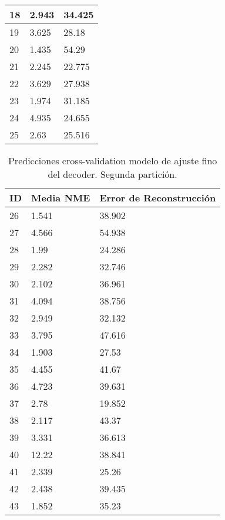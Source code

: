 \begin{table}[!ht]
\begin{tabular}{|l|l|l|}
        18 & 2.943 & 34.425 \\ \hline
        19 & 3.625 & 28.18 \\ \hline
        20 & 1.435 & 54.29 \\ \hline
        21 & 2.245 & 22.775 \\ \hline
        22 & 3.629 & 27.938 \\ \hline
        23 & 1.974 & 31.185 \\ \hline
        24 & 4.935 & 24.655 \\ \hline
        25 & 2.63 & 25.516 \\ \hline
    \end{tabular}
\end{table}

\begin{table}[!ht]
    \centering
    \caption{Predicciones cross-validation modelo de ajuste fino del  decoder. Segunda partición.}
    \begin{tabular}{|l|l|l|}
    \hline
    \cellcolor{gray!25}\textbf{ID} & \cellcolor{gray!25}\textbf{Media NME} & \cellcolor{gray!25}\textbf{Error de Reconstrucción} \\ \hline
        26 & 1.541 & 38.902 \\ \hline
        27 & 4.566 & 54.938 \\ \hline
        28 & 1.99 & 24.286 \\ \hline
        29 & 2.282 & 32.746 \\ \hline
        30 & 2.102 & 36.961 \\ \hline
        31 & 4.094 & 38.756 \\ \hline
        32 & 2.949 & 32.132 \\ \hline
        33 & 3.795 & 47.616 \\ \hline
        34 & 1.903 & 27.53 \\ \hline
        35 & 4.455 & 41.67 \\ \hline
        36 & 4.723 & 39.631 \\ \hline
        37 & 2.78 & 19.852 \\ \hline
        38 & 2.117 & 43.37 \\ \hline
        39 & 3.331 & 36.613 \\ \hline
        40 & 12.22 & 38.841 \\ \hline
        41 & 2.339 & 25.26 \\ \hline
        42 & 2.438 & 39.435 \\ \hline
        43 & 1.852 & 35.23 \\ \hline

\end{tabular}
\end{table}
